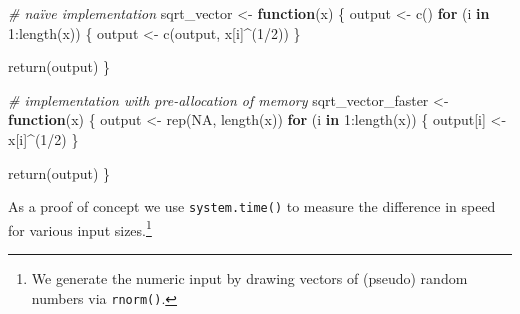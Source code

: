 \documentclass[
  12pt,
]{style/krantz}
\newenvironment{Shaded}{\begin{snugshade}}{\end{snugshade}}
\newcommand{\CommentTok}[1]{\textcolor[rgb]{0.56,0.35,0.01}{\textit{#1}}}
\newcommand{\ConstantTok}[1]{\textcolor[rgb]{0.00,0.00,0.00}{#1}}
\newcommand{\ControlFlowTok}[1]{\textcolor[rgb]{0.13,0.29,0.53}{\textbf{#1}}}
\newcommand{\DecValTok}[1]{\textcolor[rgb]{0.00,0.00,0.81}{#1}}
\newcommand{\FunctionTok}[1]{\textcolor[rgb]{0.00,0.00,0.00}{#1}}
\newcommand{\NormalTok}[1]{#1}
\newcommand{\OtherTok}[1]{\textcolor[rgb]{0.56,0.35,0.01}{#1}}
\newcommand{\SpecialCharTok}[1]{\textcolor[rgb]{0.00,0.00,0.00}{#1}}
\begin{document}
\begin{Shaded}
\begin{Highlighting}[]
\CommentTok{\# naïve implementation}
\NormalTok{sqrt\_vector }\OtherTok{\textless{}{-}} 
     \ControlFlowTok{function}\NormalTok{(x) \{}
\NormalTok{          output }\OtherTok{\textless{}{-}} \FunctionTok{c}\NormalTok{()}
          \ControlFlowTok{for}\NormalTok{ (i }\ControlFlowTok{in} \DecValTok{1}\SpecialCharTok{:}\FunctionTok{length}\NormalTok{(x)) \{}
\NormalTok{               output }\OtherTok{\textless{}{-}} \FunctionTok{c}\NormalTok{(output, x[i]}\SpecialCharTok{\^{}}\NormalTok{(}\DecValTok{1}\SpecialCharTok{/}\DecValTok{2}\NormalTok{))}
\NormalTok{          \}}
          
          \FunctionTok{return}\NormalTok{(output)}
\NormalTok{     \}}

\CommentTok{\# implementation with pre{-}allocation of memory}
\NormalTok{sqrt\_vector\_faster }\OtherTok{\textless{}{-}} 
     \ControlFlowTok{function}\NormalTok{(x) \{}
\NormalTok{          output }\OtherTok{\textless{}{-}} \FunctionTok{rep}\NormalTok{(}\ConstantTok{NA}\NormalTok{, }\FunctionTok{length}\NormalTok{(x))}
          \ControlFlowTok{for}\NormalTok{ (i }\ControlFlowTok{in} \DecValTok{1}\SpecialCharTok{:}\FunctionTok{length}\NormalTok{(x)) \{}
\NormalTok{               output[i] }\OtherTok{\textless{}{-}}\NormalTok{  x[i]}\SpecialCharTok{\^{}}\NormalTok{(}\DecValTok{1}\SpecialCharTok{/}\DecValTok{2}\NormalTok{)}
\NormalTok{          \}}
          
          \FunctionTok{return}\NormalTok{(output)}
\NormalTok{     \}}
\end{Highlighting}
\end{Shaded}

As a proof of concept we use \texttt{system.time()} to measure the difference in speed for various input sizes.\footnote{We generate the numeric input by drawing vectors of (pseudo) random numbers via \texttt{rnorm()}.}
\end{document}
